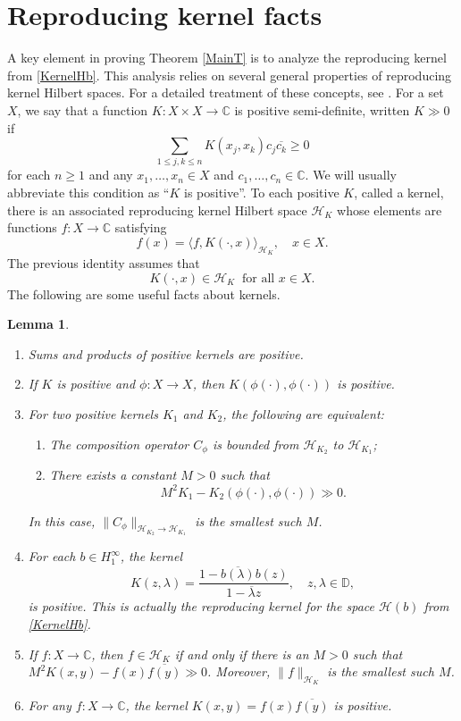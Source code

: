 \documentclass[11pt]{amsart}
\def\C{{\mathbb{C}}}
\def\D{\mathbb{D}}
\def\HH{{\mathcal H}}
\renewcommand{\leq}{\leqslant}
\renewcommand{\geq}{\geqslant}
\numberwithin{equation}{section}
\theoremstyle{plain}
\newtheorem{lemma}[equation]{Lemma}
\theoremstyle{definition}
\begin{document}
\section{Reproducing kernel facts}\label{RKfacts}


A key element in proving Theorem \ref{MainT} is to analyze the reproducing kernel from \eqref{KernelHb}. This analysis relies on several general properties of reproducing kernel Hilbert spaces. For a detailed treatment of these concepts, see \cite{MR3526117}. For a set $X$, we say that a function $K: X \times X \to \C$ is positive semi-definite, written $K\gg 0$ if
$$\sum_{1 \leq j, k \leq n} K(x_j, x_k) c_j \overline{c_k} \geq 0$$
for each $n \geq 1$ and any $x_1, \ldots, x_n \in X$ and $c_1, \ldots, c_n \in \C$. 
We will usually abbreviate this condition as ``$K$ is positive''. 
To each positive $K$, called a kernel, there is an associated reproducing kernel Hilbert space $\mathcal{H}_K$ whose elements are functions $f: X \to \C$ satisfying 
$$f(x) = \langle f, K(\cdot, x)\rangle_{\mathcal{H}_{K}}, \quad x \in X.$$
The previous identity assumes that  
\begin{equation}\label{containskernels}
K(\cdot, x) \in \HH_{K} \; \; \mbox{for all $x \in X$}.
\end{equation}
The following are some useful facts about kernels.
 

\begin{lemma}\label{le:basic}
	\begin{enumerate}
		\item  Sums and products of positive kernels are positive.
		
		\item If $K$ is positive and $\phi:X\to X$, then $K(\phi(\cdot),\phi(\cdot))$ is positive.
		\item 
		For two positive kernels $ K_1$ and $K_2 $, 
		the following are equivalent: 
		\begin{enumerate}
		\item The composition operator $C_\phi$ is bounded from $\mathcal{H}_{K_2}$ to $\mathcal{H}_{K_1}$; 
		\item There exists a constant $M>0$ such that $$M^2K_1-K_2(\phi(\cdot), \phi(\cdot))\gg0.$$
		\end{enumerate}
		In this case, $\|C_\phi\|_{\HH_{K_2} \to \HH_{K_1}}$ is the smallest such $M$.
		\item For each $b\in H^\infty_1$, the kernel
		\[
		K(z, \lambda) = \frac{1- \overline{b(\lambda)}b(z)}{1-\overline{\lambda} z}, \quad z, \lambda \in \D,
		\]
		is positive. This is actually the reproducing kernel for the space $\HH(b)$ from \eqref{KernelHb}.
        \item If $f: X \to \C$, then $f \in \HH_{K}$ if and only if there is an $M > 0$ such that $M^2 K(x, y) - f(x) \overline{f(y)}\gg0$. Moreover,  $\|f\|_{\HH_{K}}$ is the smallest such $M$. 
        \item For any $f: X \to \C$, the kernel $K(x, y) = f(x) \overline{f(y)}$ is positive. 
	\end{enumerate}
\end{lemma}
\end{document}
